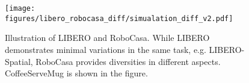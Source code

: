 \begin{figure}[h]
    \centering
    \texttt{[image: figures/libero\_robocasa\_diff/simualation\_diff\_v2.pdf]}
    \caption{Illustration of LIBERO and RoboCasa. While LIBERO demonstrates minimal variations in the same task, e.g. LIBERO-Spatial, RoboCasa provides diversities in different aspects. CoffeeServeMug is shown in the figure.}
    \label{fig:libero_robocasa_diff}
\end{figure}